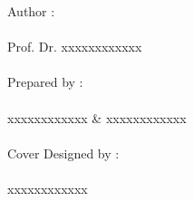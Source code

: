 \vspace*{.5cm}
{\fontsize{15pt}{0} \Garamondfont \selectfont
    \lipsum[1-2]
}

\par
\vspace*{5cm}
{\fontsize{20pt}{0}
    Author : \\\\
    \color{white} \fancyfont Prof. Dr. xxxxxxxxxxxx
    \\ \\ 
    \color{cover}Prepared by :\\\\
    \color{white} \fancyfont xxxxxxxxxxxx \& xxxxxxxxxxxx
    \\ \\
    \color{cover} Cover Designed by :\\\\
    \color{white} \fancyfont xxxxxxxxxxxx
}
\restoregeometry
\endgroup